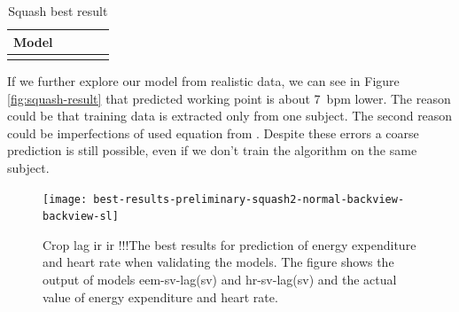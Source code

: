 \begin{table}[!htbp]
	\centering
	\begin{tabular}{l S[table-format=1.2, round-mode=places, round-precision=2] S[table-format=1.2, round-mode=places, round-precision=2] S[table-format=1.2, round-mode=places, round-precision=2] S[table-format=1.2, round-mode=places, round-precision=2]}
		\toprule
		\textbf{Model} &  &  &  &  \\
		\midrule
		\bottomrule
	\end{tabular}
	\caption{Squash best result}
	\label{tab:squash}
\end{table}

If we further explore our model from realistic data, we can see in Figure \ref{fig:squash-result} that predicted working point is about \SI{7}{bpm} lower. The reason could be that training data is extracted only from one subject. The second reason could be imperfections of used equation from \cite{charlot2014improvement}. Despite these errors a coarse prediction is still possible, even if we don't train the algorithm on the same subject.


\begin{figure}[!htbp]
	\centering
	\texttt{[image: best-results-preliminary-squash2-normal-backview-backview-sl]}
	\caption{Crop lag ir ir !!!The best results for prediction of energy expenditure and heart rate when validating the models. The figure shows the output of models eem-sv-lag(sv) and hr-sv-lag(sv) and the actual value of energy expenditure and heart rate.}
	\label{fig:squash-rezultat}
\end{figure}






















